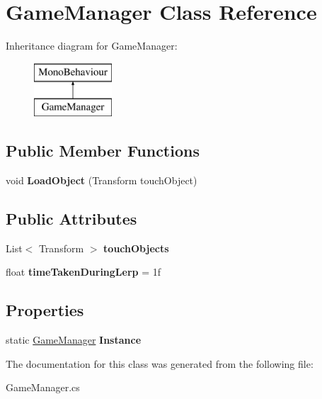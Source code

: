 \hypertarget{class_game_manager}{}\section{Game\+Manager Class Reference}
\label{class_game_manager}
Inheritance diagram for Game\+Manager\+:\begin{figure}[H]
\begin{center}
\leavevmode
\includegraphics[height=2.000000cm]{class_game_manager}
\end{center}
\end{figure}
\subsection*{Public Member Functions}
\begin{DoxyCompactItemize}
\item 
\mbox{\label{class_game_manager_a9ca299160f5af64bf3b19da2d2fa0feb}} 
void {\bfseries Load\+Object} (Transform touch\+Object)
\end{DoxyCompactItemize}
\subsection*{Public Attributes}
\begin{DoxyCompactItemize}
\item 
\mbox{\label{class_game_manager_a5d670dd9d695d7401b98017fe483cdd9}} 
List$<$ Transform $>$ {\bfseries touch\+Objects}
\item 
\mbox{\label{class_game_manager_a564b08c23d0ca3bac1e81786e8b37ca9}} 
float {\bfseries time\+Taken\+During\+Lerp} = 1f
\end{DoxyCompactItemize}
\subsection*{Properties}
\begin{DoxyCompactItemize}
\item 
\mbox{\label{class_game_manager_ad3e717f4fb0f378b969f4457de81f23e}} 
static \hyperlink{class_game_manager}{Game\+Manager} {\bfseries Instance}
\end{DoxyCompactItemize}


The documentation for this class was generated from the following file\+:\begin{DoxyCompactItemize}
\item 
Game\+Manager.\+cs\end{DoxyCompactItemize}
